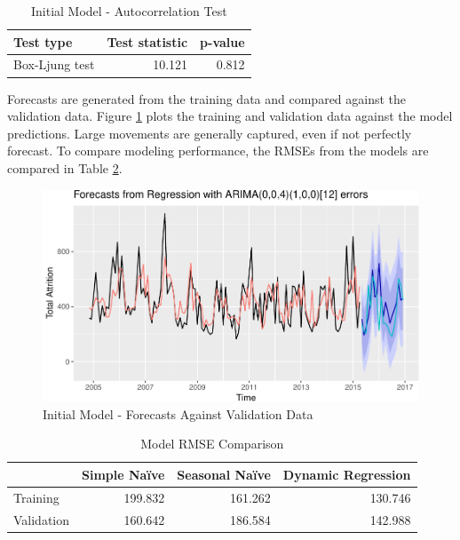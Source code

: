 \documentclass[12pt,letterpaper,toc=flat,oneside]{report}
\theoremstyle{definition}
\theoremstyle{definition}
\theoremstyle{definition}
\theoremstyle{remark}
\begin{document}
\begin{table}[!h]

\caption{\label{tab:dynreg1-boxtest}Initial Model - Autocorrelation Test}
\centering
\begin{tabular}[t]{lrr}
\toprule
\bfseries{Test type} & \bfseries{Test statistic} & \bfseries{p-value}\\
\midrule
Box-Ljung test & 10.121 & 0.812\\
\bottomrule
\end{tabular}
\end{table}

Forecasts are generated from the training data and compared against the
validation data. Figure \ref{fig:dynreg1-forecast} plots the training
and validation data against the model predictions. Large movements are
generally captured, even if not perfectly forecast. To compare modeling
performance, the RMSEs from the models are compared in Table
\ref{tab:model-compare-1}.

\begin{figure}[H]

{\centering \includegraphics{elliott-econometric-personnel-retention-18_files/figure-latex/dynreg1-forecast-1} 

}

\caption{Initial Model - Forecasts Against Validation Data}\label{fig:dynreg1-forecast}
\end{figure}

\begin{table}[!h]

\caption{\label{tab:model-compare-1}Model RMSE Comparison}
\centering
\begin{tabular}[t]{lrrr}
\toprule
\bfseries{ } & \bfseries{Simple Naïve} & \bfseries{Seasonal Naïve} & \bfseries{Dynamic Regression}\\
\midrule
Training & 199.832 & 161.262 & 130.746\\
Validation & 160.642 & 186.584 & 142.988\\
\bottomrule
\end{tabular}
\end{table}
\end{document}

